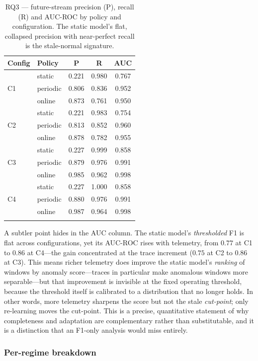 \documentclass[pdflatex,sn-mathphys-num]{sn-jnl}%
\theoremstyle{thmstyleone}%
\theoremstyle{thmstyletwo}%
\theoremstyle{thmstylethree}%
\begin{document}
\begin{table}[t]
\caption{RQ3 --- future-stream precision (P), recall (R) and AUC-ROC by policy and configuration. The static model's flat, collapsed precision with near-perfect recall is the stale-normal signature.}\label{tab:rq3-prf}
\begin{tabular}{@{}llccc@{}}
\toprule
Config & Policy & P & R & AUC \\
\midrule
\multirow{3}{*}{C1}
 & static   & 0.221 & 0.980 & 0.767 \\
 & periodic & 0.806 & 0.836 & 0.952 \\
 & online   & 0.873 & 0.761 & 0.950 \\
\midrule
\multirow{3}{*}{C2}
 & static   & 0.221 & 0.983 & 0.754 \\
 & periodic & 0.813 & 0.852 & 0.960 \\
 & online   & 0.878 & 0.782 & 0.955 \\
\midrule
\multirow{3}{*}{C3}
 & static   & 0.227 & 0.999 & 0.858 \\
 & periodic & 0.879 & 0.976 & 0.991 \\
 & online   & 0.985 & 0.962 & 0.998 \\
\midrule
\multirow{3}{*}{C4}
 & static   & 0.227 & 1.000 & 0.858 \\
 & periodic & 0.880 & 0.976 & 0.991 \\
 & online   & 0.987 & 0.964 & 0.998 \\
\botrule
\end{tabular}
\end{table}

A subtler point hides in the AUC column. The static model's \emph{thresholded} F1 is flat across configurations, yet its AUC-ROC rises with telemetry, from $0.77$ at C1 to $0.86$ at C4---the gain concentrated at the trace increment ($0.75$ at C2 to $0.86$ at C3). This means richer telemetry does improve the static model's \emph{ranking} of windows by anomaly score---traces in particular make anomalous windows more separable---but that improvement is invisible at the fixed operating threshold, because the threshold itself is calibrated to a distribution that no longer holds. In other words, more telemetry sharpens the score but not the stale \emph{cut-point}; only re-learning moves the cut-point. This is a precise, quantitative statement of why completeness and adaptation are complementary rather than substitutable, and it is a distinction that an F1-only analysis would miss entirely.

\subsubsection{Per-regime breakdown}\label{sec:res-rq3-regime}
\end{document}
